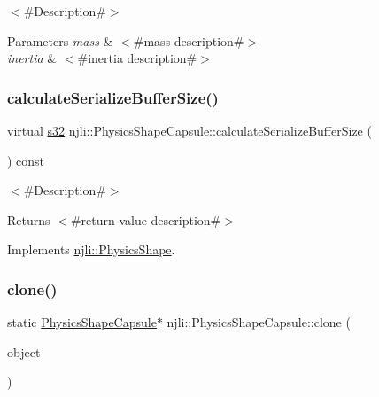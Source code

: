 $<$\#\+Description\#$>$


\begin{DoxyParams}{Parameters}
{\em mass} & $<$\#mass description\#$>$ \\
\hline
{\em inertia} & $<$\#inertia description\#$>$ \\
\hline
\end{DoxyParams}
\mbox{\label{classnjli_1_1_physics_shape_capsule_a02e303c62d9e0924d4e7649b9bd7bffd}} 
\subsubsection{\texorpdfstring{calculate\+Serialize\+Buffer\+Size()}{calculateSerializeBufferSize()}}
{\footnotesize\ttfamily virtual \mbox{\hyperlink{_util_8h_aa62c75d314a0d1f37f79c4b73b2292e2}{s32}} njli\+::\+Physics\+Shape\+Capsule\+::calculate\+Serialize\+Buffer\+Size (\begin{DoxyParamCaption}{ }\end{DoxyParamCaption}) const\hspace{0.3cm}{\ttfamily [virtual]}}

$<$\#\+Description\#$>$

\begin{DoxyReturn}{Returns}
$<$\#return value description\#$>$ 
\end{DoxyReturn}


Implements \mbox{\hyperlink{classnjli_1_1_physics_shape_a0612a1c8c3f4520d78cb7f5838f03074}{njli\+::\+Physics\+Shape}}.

\mbox{\label{classnjli_1_1_physics_shape_capsule_ab697ab88912433e342844d090492cd7d}} 
\subsubsection{\texorpdfstring{clone()}{clone()}}
{\footnotesize\ttfamily static \mbox{\hyperlink{classnjli_1_1_physics_shape_capsule}{Physics\+Shape\+Capsule}}$\ast$ njli\+::\+Physics\+Shape\+Capsule\+::clone (\begin{DoxyParamCaption}\item[{const \mbox{\hyperlink{classnjli_1_1_physics_shape_capsule}{Physics\+Shape\+Capsule}} \&}]{object }\end{DoxyParamCaption})\hspace{0.3cm}{\ttfamily [static]}}

